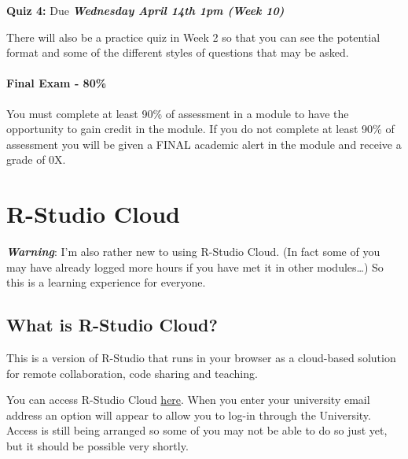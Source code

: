 \documentclass[
  openany]{book}
\begin{document}
\textbf{Quiz 4:} Due \textbf{\emph{Wednesday April 14th 1pm (Week 10)}}

There will also be a practice quiz in Week 2 so that you can see the potential format and some of the different styles of questions that may be asked.

\hypertarget{final-exam---80}{%
\subsubsection*{Final Exam - 80\%}\label{final-exam---80}}

You must complete at least 90\% of assessment in a module to have the opportunity to gain credit in the module. If you do not complete at least 90\% of assessment you will be given a FINAL academic alert in the module and receive a grade of 0X.

\hypertarget{r-studio-cloud}{%
\chapter*{R-Studio Cloud}\label{r-studio-cloud}}

\textbf{\emph{Warning}}: I'm also rather new to using R-Studio Cloud. (In fact some of you may have already logged more hours if you have met it in other modules\ldots) So this is a learning experience for everyone.

\hypertarget{what-is-r-studio-cloud}{%
\section*{What is R-Studio Cloud?}\label{what-is-r-studio-cloud}}

This is a version of R-Studio that runs in your browser as a cloud-based solution for remote collaboration, code sharing and teaching.

You can access R-Studio Cloud \href{https://login.rstudio.cloud/login?setup=1\&redirect=\%2Foauth\%2Fauthorize\%3Fresponse_type\%3Dcode\%26client_id\%3Drstudio-cloud\%26show_auth\%3D0\%26redirect_uri\%3Dhttps\%253A\%252F\%252Frstudio.cloud\%252Flogin\%26show_login\%3D1}{here}. When you enter your university email address an option will appear to allow you to log-in through the University. Access is still being arranged so some of you may not be able to do so just yet, but it should be possible very shortly.
\end{document}
